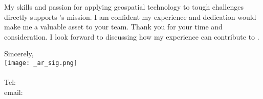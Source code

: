 \documentclass[letterpaper]{article}
\begin{document}
My skills and passion for applying geospatial technology to tough challenges directly supports {\JobCompany}’s mission.
I am confident my experience and dedication would make me a valuable asset to your team.
Thank you for your time and consideration.
I look forward to discussing how my experience can contribute to {\JobCompany}.

Sincerely,\\
    \hspace{1em}
    \texttt{[image: \_ar\_sig.png]} \\
    \CVsigname \\
    \small
    Tel: \CVphone \\
    email: \CVemail
\end{document}
